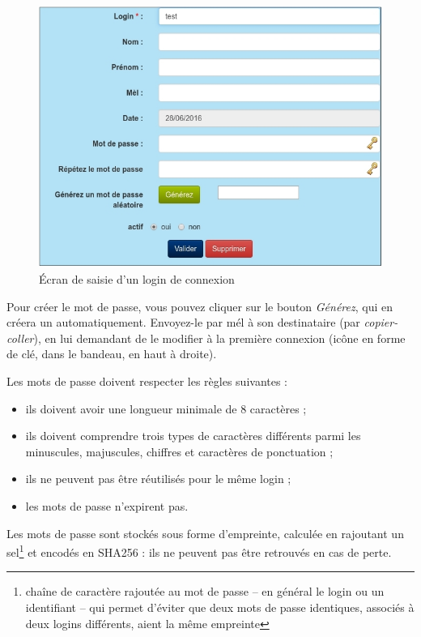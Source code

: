 \begin{figure}[H]
\includegraphics[width=\linewidth]{dessin/user_create}
\caption{Écran de saisie d'un login de connexion}
\end{figure}

Pour créer le mot de passe, vous pouvez cliquer sur le bouton \textit{Générez}, qui  en créera un automatiquement. Envoyez-le par mél à son destinataire (par \textit{copier-coller}), en lui demandant de le modifier à la première connexion (icône en forme de clé, dans le bandeau, en haut à droite).

Les mots de passe doivent respecter les règles suivantes :
\begin{itemize}
\item ils doivent avoir une longueur minimale de 8 caractères ;
\item ils doivent comprendre trois types de caractères différents parmi les minuscules, majuscules, chiffres et caractères de ponctuation ;
\item ils ne peuvent pas être réutilisés pour le même login ;
\item les mots de passe n'expirent pas.
\end{itemize}

Les mots de passe sont stockés sous forme d'empreinte, calculée en rajoutant un sel\footnote{chaîne de caractère rajoutée au mot de passe -- en général le login ou un identifiant -- qui permet d'éviter que deux mots de passe identiques, associés à deux logins différents, aient la même empreinte} et encodés en SHA256 : ils ne peuvent pas être retrouvés en cas de perte.

